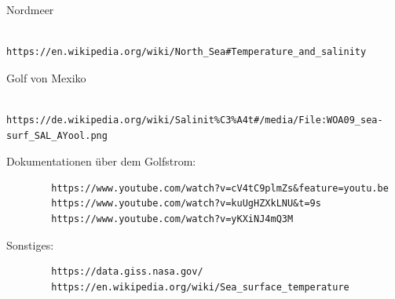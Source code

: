 \documentclass[a4paper,twoside]{article}
\begin{document}
	\noindent Nordmeer
	\begin{verbatim}
		https://en.wikipedia.org/wiki/North_Sea#Temperature_and_salinity
	\end{verbatim}
	Golf von Mexiko
	\begin{verbatim}
	https://de.wikipedia.org/wiki/Salinit%C3%A4t#/media/File:WOA09_sea-surf_SAL_AYool.png
	\end{verbatim}		
	
	Dokumentationen über dem Golfstrom: 
	\begin{verbatim}
		https://www.youtube.com/watch?v=cV4tC9plmZs&feature=youtu.be
		https://www.youtube.com/watch?v=kuUgHZXkLNU&t=9s
		https://www.youtube.com/watch?v=yKXiNJ4mQ3M
  	\end{verbatim}		
	Sonstiges: 
	\begin{verbatim}
		https://data.giss.nasa.gov/
		https://en.wikipedia.org/wiki/Sea_surface_temperature
	\end{verbatim}
	
	\newpage
	\nocite{*}
	
	
\end{document}

